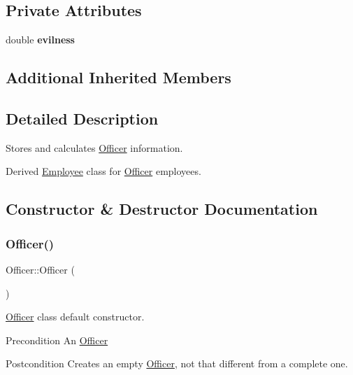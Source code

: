 \subsection*{Private Attributes}
\begin{DoxyCompactItemize}
\item 
\mbox{\label{classOfficer_a63465c5f16e8148e5bc0a3bb4ecd1781}} 
double {\bfseries evilness}
\end{DoxyCompactItemize}
\subsection*{Additional Inherited Members}


\subsection{Detailed Description}
Stores and calculates \hyperlink{classOfficer}{Officer} information. 

Derived \hyperlink{classEmployee}{Employee} class for \hyperlink{classOfficer}{Officer} employees. 

\subsection{Constructor \& Destructor Documentation}
\mbox{\label{classOfficer_a80ac1e36a3f36c3a7e12b5dc9320ad89}} 
\subsubsection{\texorpdfstring{Officer()}{Officer()}\hspace{0.1cm}{\footnotesize\ttfamily [1/2]}}
{\footnotesize\ttfamily Officer\+::\+Officer (\begin{DoxyParamCaption}{ }\end{DoxyParamCaption})}

\hyperlink{classOfficer}{Officer} class default constructor.

\begin{DoxyPrecond}{Precondition}
An \hyperlink{classOfficer}{Officer} 
\end{DoxyPrecond}
\begin{DoxyPostcond}{Postcondition}
Creates an empty \hyperlink{classOfficer}{Officer}, not that different from a complete one. 
\end{DoxyPostcond}
\mbox{\label{classOfficer_ac75c45d6e8628606278cb4ce6596f67f}} 
